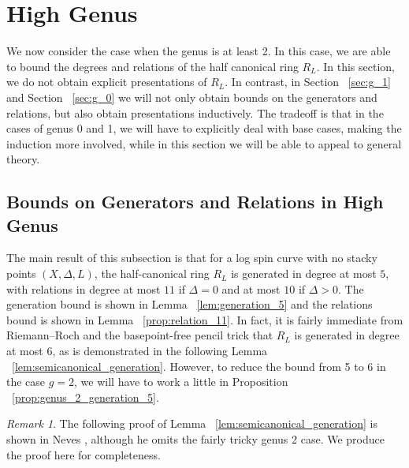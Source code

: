 \documentclass{amsart}
\theoremstyle{plain}
\theoremstyle{definition}
\theoremstyle{remark}
\newtheorem{rem}[thm]{Remark}
\numberwithin{equation}{section}
\newcommand\ssec{\subsection}
\begin{document}

\section{High Genus}
\label{sec:g_high}
We now consider the case when the genus is at least 2. In this case, we are able to bound the degrees and relations of the half canonical ring $R_L$. In this section, we do not obtain explicit presentations of $R_L.$ In contrast, in Section ~\ref{sec:g_1} and Section ~\ref{sec:g_0} we will not only obtain bounds on the generators and relations, but also obtain presentations inductively. The tradeoff is that in the cases of genus 0 and 1, we will have to explicitly deal with base cases, making the induction more involved, while in this section we will be able to appeal to general theory.

\ssec{Bounds on Generators and Relations in High Genus}

The main result of this subsection is that for a log spin curve with no stacky points $(X,\Delta,L)$, the half-canonical ring $R_L$ is generated in degree at most $5$, with relations in degree at most $11$ if $\Delta = 0$ and at most $10$ if $\Delta > 0$. The generation bound is shown in Lemma ~\ref{lem:generation_5} and the relations bound is shown in Lemma ~\ref{prop:relation_11}. In fact, it is fairly immediate from Riemann--Roch and the basepoint-free pencil trick that $R_L$ is generated in degree at most $6$, as is demonstrated in the following
Lemma ~\ref{lem:semicanonical_generation}. However, to reduce the bound from 5 to 6 in the case $g =2$, we will have to work a little in Proposition ~\ref{prop:genus_2_generation_5}. 

\begin{rem}
The following proof of Lemma ~\ref{lem:semicanonical_generation} is shown in Neves \cite[Proposition III.4]{neves:halfcan}, although he omits the fairly tricky genus 2 case. We produce the proof here for completeness.
\end{rem}
\end{document}
